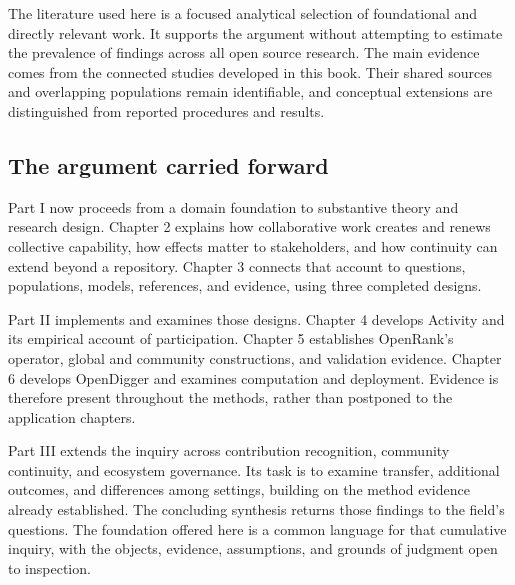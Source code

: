 The literature used here is a focused analytical selection of foundational and directly relevant work. It supports the argument without attempting to estimate the prevalence of findings across all open source research. The main evidence comes from the connected studies developed in this book. Their shared sources and overlapping populations remain identifiable, and conceptual extensions are distinguished from reported procedures and results.

\subsection{The argument carried forward}
Part I now proceeds from a domain foundation to substantive theory and research design. Chapter 2 explains how collaborative work creates and renews collective capability, how effects matter to stakeholders, and how continuity can extend beyond a repository. Chapter 3 connects that account to questions, populations, models, references, and evidence, using three completed designs.

Part II implements and examines those designs. Chapter 4 develops Activity and its empirical account of participation. Chapter 5 establishes OpenRank's operator, global and community constructions, and validation evidence. Chapter 6 develops OpenDigger and examines computation and deployment. Evidence is therefore present throughout the methods, rather than postponed to the application chapters.

Part III extends the inquiry across contribution recognition, community continuity, and ecosystem governance. Its task is to examine transfer, additional outcomes, and differences among settings, building on the method evidence already established. The concluding synthesis returns those findings to the field's questions. The foundation offered here is a common language for that cumulative inquiry, with the objects, evidence, assumptions, and grounds of judgment open to inspection.
